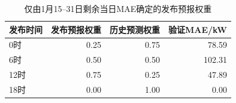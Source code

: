 \begin{table}[H]
\centering\small
\caption{仅由1月15--31日剩余当日MAE确定的发布预报权重}
\label{tab:blend_weights}
\begin{tabular}{lrrr}\toprule
发布时间 & 发布预报权重 & 历史预测权重 & 验证MAE/kW \\\midrule
0时 & 0.25 & 0.75 & 78.59 \\
6时 & 0.50 & 0.50 & 102.31 \\
12时 & 0.75 & 0.25 & 47.89 \\
18时 & 0.00 & 1.00 & 0.00 \\
\bottomrule\end{tabular}
\end{table}
